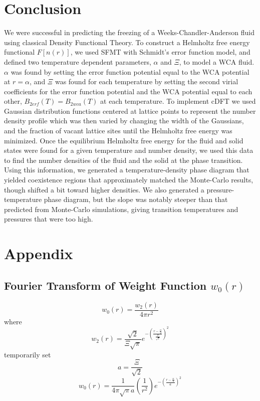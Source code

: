 \documentclass[double,12pt]{beavtex}
\begin{document}
\chapter{Conclusion}
We were successful in predicting the freezing of a Weeks-Chandler-Anderson 
fluid using classical Density Functional Theory. To construct a Helmholtz 
free energy functional $F[n(r)]$, we used SFMT with Schmidt's error 
function model, and defined two temperature dependent parameters, $\alpha$ 
and $\Xi$, to model a WCA fluid. 
$\alpha$ was found by setting the error function potential equal to the 
WCA potential at $r=\alpha$, and $\Xi$ was found for each temperature by 
setting the second virial coefficients for the error function potential 
and the WCA potential equal to each other, $B_{2erf}(T)=B_{2wca}(T)$ 
at each temperature.
To implement cDFT we used Gaussian distribution functions centered at 
lattice points to represent the number density profile which was then varied
by changing the width of the Gaussians, and the fraction of vacant lattice
sites until the Helmholtz free energy was minimized. Once the equilibrium 
Helmholtz free energy for the fluid and solid states were found for a given
temperature and number density, 
we used this data 
to find the number densities of the fluid and the solid at the phase transition.
Using this information, we generated a temperature-density 
phase diagram that yielded coexistence regions that approximately 
matched the Monte-Carlo
results, though shifted a bit toward higher densities. 
We also generated a pressure-temperature
phase diagram, but the slope was notably steeper than that
predicted from Monte-Carlo simulations, giving transition 
temperatures and pressures that were too high. 



\backmatter

\chapter{Appendix}

\section{Fourier Transform of Weight Function $w_0(r)$}
\begin{equation}{w_0(r)=\frac{w_2(r)}{4{\pi}r^2}}\end{equation}
where
\begin{equation}{w_2(r)=\frac{\sqrt{2}}{\Xi\sqrt{\pi}}e^{-\left(\frac{r-\frac{\alpha}{2}}{\frac{\Xi}{\sqrt{2}}}\right)^2}}\end{equation}
temporarily set 
\begin{equation}{a=\frac{\Xi}{\sqrt{2}}}\end{equation}
\begin{equation}{w_0(r)=\frac{1}{4{\pi}\sqrt{\pi}a}\left(\frac{1}{r^2}\right)e^{-\left(\frac{r-\frac{\alpha}{2}}{a}\right)^2}}\end{equation}
\end{document}
